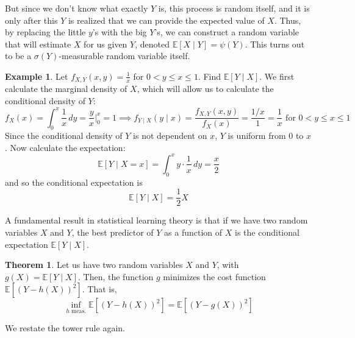 \documentclass{article}
\theoremstyle{definition}
\newtheorem{theorem}{Theorem}[section]
\newtheorem{example}{Example}[section]
\theoremstyle{remark}
\theoremstyle{definition}
\begin{document}
But since we don't know what exactly $Y$ is, this process is random itself, and it is only after this $Y$ is realized that we can provide the expected value of $X$. Thus, by replacing the little $y$'s with the big $Y$'s, we can construct a random variable that will estimate $X$ for us given $Y$, denoted $\mathbb{E}[X \mid Y] = \psi(Y)$. This turns out to be a $\sigma(Y)$-measurable random variable itself. 

\begin{example}
Let $f_{X, Y} (x, y) = \frac{1}{x}$ for $0 < y \leq x \leq 1$. Find $\mathbb{E}[Y \mid X]$. We first calculate the marginal density of $X$, which will allow us to calculate the conditional density of $Y$: 
\[f_X (x) = \int_0^x \frac{1}{x} \,dy = \frac{y}{x} \bigg|_0^x = 1 \implies f_{Y \mid X} (y \mid x) = \frac{f_{X, Y} (x, y)}{f_X (x)} = \frac{1/x}{1} = \frac{1}{x} \text{ for } 0 < y \leq x \leq 1\]
Since the conditional density of $Y$ is not dependent on $x$, $Y$ is uniform from $0$ to $x$. Now calculate the expectation: 
\[\mathbb{E}[Y \mid X = x] = \int_0^x y \cdot \frac{1}{x} \,dy = \frac{x}{2}\]
and so the conditional expectation is 
\[\mathbb{E}[Y \mid X] = \frac{1}{2} X\]
\end{example}

A fundamental result in statistical learning theory is that if we have two random variables $X$ and $Y$, the best predictor of $Y$ as a function of $X$ is the conditional expectation $\mathbb{E}[Y \mid X]$. 

\begin{theorem}
Let us have two random variables $X$ and $Y$, with $g(X) = \mathbb{E}[Y \mid X]$. Then, the function $g$ minimizes the cost function $\mathbb{E}[ (Y - h(X))^2]$. That is, 
\[\inf_{h \text{ meas.}} \mathbb{E}[( Y - h(X))^2] = \mathbb{E} [(Y - g(X))^2]\]
\end{theorem}

We restate the tower rule again. 
\end{document}
